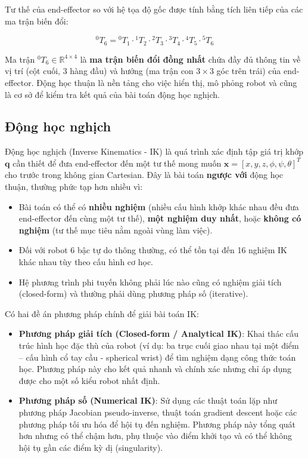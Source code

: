 Tư thế của end-effector so với hệ tọa độ gốc được tính bằng tích liên tiếp của các ma trận biến đổi:

\begin{equation}
^0T_6 = {^0T_1} \cdot {^1T_2} \cdot {^2T_3} \cdot {^3T_4} \cdot {^4T_5} \cdot {^5T_6}
\end{equation}

Ma trận $^0T_6 \in \mathbb{R}^{4 \times 4}$ là \textbf{ma trận biến đổi đồng nhất} chứa đầy đủ thông tin về vị trí (cột cuối, 3 hàng đầu) và hướng (ma trận con $3\times3$ góc trên trái) của end-effector. Động học thuận là nền tảng cho việc hiển thị, mô phỏng robot và cũng là cơ sở để kiểm tra kết quả của bài toán động học nghịch.

\subsection{Động học nghịch}

Động học nghịch (Inverse Kinematics - IK) là quá trình xác định tập giá trị khớp $\mathbf{q}$ cần thiết để đưa end-effector đến một tư thế mong muốn $\mathbf{x} = [x, y, z, \phi, \psi, \theta]^T$ cho trước trong không gian Cartesian. Đây là bài toán \textbf{ngược với} động học thuận, thường phức tạp hơn nhiều vì:

\begin{itemize}
    \item Bài toán có thể có \textbf{nhiều nghiệm} (nhiều cấu hình khớp khác nhau đều đưa end-effector đến cùng một tư thế), \textbf{một nghiệm duy nhất}, hoặc \textbf{không có nghiệm} (tư thế mục tiêu nằm ngoài vùng làm việc).
    \item Đối với robot 6 bậc tự do thông thường, có thể tồn tại đến 16 nghiệm IK khác nhau tùy theo cấu hình cơ học.
    \item Hệ phương trình phi tuyến không phải lúc nào cũng có nghiệm giải tích (closed-form) và thường phải dùng phương pháp số (iterative).
\end{itemize}

Có hai đề án phương pháp chính để giải bài toán IK:

\begin{itemize}
    \item \textbf{Phương pháp giải tích (Closed-form / Analytical IK)}: Khai thác cấu trúc hình học đặc thù của robot (ví dụ: ba trục cuối giao nhau tại một điểm – cấu hình cổ tay cầu - spherical wrist) để tìm nghiệm dạng công thức toán học. Phương pháp này cho kết quả nhanh và chính xác nhưng chỉ áp dụng được cho một số kiểu robot nhất định.
    
    \item \textbf{Phương pháp số (Numerical IK)}: Sử dụng các thuật toán lặp như phương pháp Jacobian pseudo-inverse, thuật toán gradient descent hoặc các phương pháp tối ưu hóa để hội tụ đến nghiệm. Phương pháp này tổng quát hơn nhưng có thể chậm hơn, phụ thuộc vào điểm khởi tạo và có thể không hội tụ gần các điểm kỳ dị (singularity).
\end{itemize}



